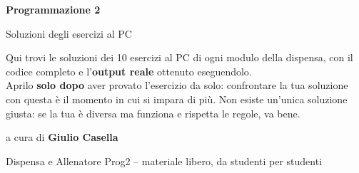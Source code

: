 \begin{titlepage}
  \centering
  \vspace*{3cm}
  {\Huge\bfseries Programmazione 2\par}
  \vspace{0.6cm}
  {\Large Soluzioni degli esercizi al PC\par}
  \vspace{1.5cm}
  \begin{tcolorbox}[colback=blue!4!sfondo,colframe=blue!55!black,width=0.85\textwidth,title=Come usare questo volume]
    Qui trovi le soluzioni dei 10 esercizi al PC di ogni modulo della dispensa,
    con il codice completo e l'\textbf{output reale} ottenuto eseguendolo.\\[0.4em]
    Aprilo \textbf{solo dopo} aver provato l'esercizio da solo: confrontare la tua
    soluzione con questa è il momento in cui si impara di più. Non esiste un'unica
    soluzione giusta: se la tua è diversa ma funziona e rispetta le regole, va bene.
  \end{tcolorbox}
  \vfill
  {\large a cura di \textbf{Giulio Casella}\par}
  \vspace{0.2cm}
  {\small Dispensa e Allenatore Prog2 -- materiale libero, da studenti per studenti\par}
\end{titlepage}

\tableofcontents
















\appendix

